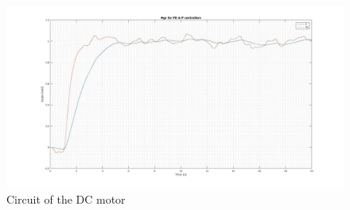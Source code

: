 \begin{figure}[H]
\centering
\includegraphics[scale=0.2]{figures/PD_P_Noise.jpg}
\caption{Circuit of the DC motor}
\label{dcmotor_circuit}
\end{figure}
